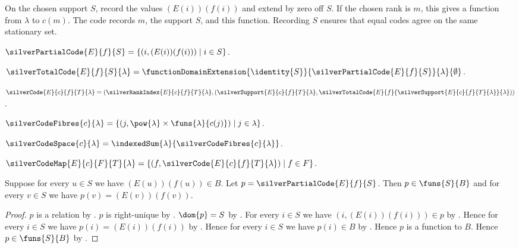 On the chosen support $S$, record the values $(E(i))(f(i))$ and extend by
zero off $S$. If the chosen rank is $m$, this gives a function from $\lambda$
to $c(m)$. The code records $m$, the support $S$, and this function.
Recording $S$ ensures that equal codes agree on the same stationary set.

\begin{definition}\label{silver_partial_code}
    $\silverPartialCode{E}{f}{S}
        =\{(i,(E(i))(f(i)))\mid i\in S\}$.
\end{definition}

\begin{definition}\label{silver_total_code}
    $\silverTotalCode{E}{f}{S}{\lambda}
        =\functionDomainExtension{\identity{S}}
            {\silverPartialCode{E}{f}{S}}{\lambda}{\emptyset}$.
\end{definition}

\begin{definition}\label{silver_code}
    $\silverCode{E}{c}{f}{T}{\lambda}
        =(\silverRankIndex{E}{c}{f}{T}{\lambda},
            (\silverSupport{E}{c}{f}{T}{\lambda},
             \silverTotalCode{E}{f}
                {\silverSupport{E}{c}{f}{T}{\lambda}}{\lambda}))$.
\end{definition}

\begin{definition}\label{silver_code_fibres}
    $\silverCodeFibres{c}{\lambda}
        =\{(j,\pow{\lambda}\times\funs{\lambda}{c(j)})
            \mid j\in\lambda\}$.
\end{definition}

\begin{definition}\label{silver_code_space}
    $\silverCodeSpace{c}{\lambda}
        =\indexedSum{\lambda}{\silverCodeFibres{c}{\lambda}}$.
\end{definition}

\begin{definition}\label{silver_code_map}
    $\silverCodeMap{E}{c}{F}{T}{\lambda}
        =\{(f,\silverCode{E}{c}{f}{T}{\lambda})\mid f\in F\}$.
\end{definition}

\begin{proposition}\label{silver_partial_code_type}
    Suppose for every $u\in S$ we have $(E(u))(f(u))\in B$.
    Let $p=\silverPartialCode{E}{f}{S}$.
    Then $p\in\funs{S}{B}$ and
        for every $v\in S$ we have $p(v)=(E(v))(f(v))$.
\end{proposition}
\begin{proof}
    $p$ is a relation by .
    $p$ is right-unique
        by .
    $\dom{p}=S$
        by .
    For every $i\in S$ we have $(i,(E(i))(f(i)))\in p$
        by .
    Hence for every $i\in S$ we have $p(i)=(E(i))(f(i))$
        by .
    Hence for every $i\in S$ we have $p(i)\in B$ by \auto.
    Hence $p$ is a function to $B$.
    Hence $p\in\funs{S}{B}$ by .
\end{proof}

